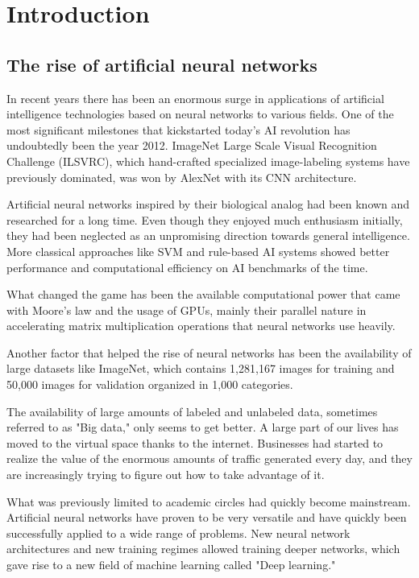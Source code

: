 \chapter*{Introduction}

\section{The rise of artificial neural networks}
In recent years there has been an enormous surge in applications of artificial intelligence technologies based on neural networks to various fields. One of the most significant milestones that kickstarted today's AI revolution has undoubtedly been the year 2012. ImageNet Large Scale Visual Recognition Challenge (ILSVRC), which hand-crafted specialized image-labeling systems have previously dominated, was won by AlexNet with its CNN architecture.

Artificial neural networks inspired by their biological analog had been known and researched for a long time. Even though they enjoyed much enthusiasm initially, they had been neglected as an unpromising direction towards general intelligence. More classical approaches like SVM and rule-based AI systems showed better performance and computational efficiency on AI benchmarks of the time. 

What changed the game has been the available computational power that came with Moore's law and the usage of GPUs, mainly their parallel nature in accelerating matrix multiplication operations that neural networks use heavily.

Another factor that helped the rise of neural networks has been the availability of large datasets like ImageNet, which contains 1,281,167 images for training and 50,000 images for validation organized in 1,000 categories. 

The availability of large amounts of labeled and unlabeled data, sometimes referred to as "Big data," only seems to get better. A large part of our lives has moved to the virtual space thanks to the internet. Businesses had started to realize the value of the enormous amounts of traffic generated every day, and they are increasingly trying to figure out how to take advantage of it.

What was previously limited to academic circles had quickly become mainstream. Artificial neural networks have proven to be very versatile and have quickly been successfully applied to a wide range of problems. New neural network architectures and new training regimes allowed training deeper networks, which gave rise to a new field of machine learning called "Deep learning." 

